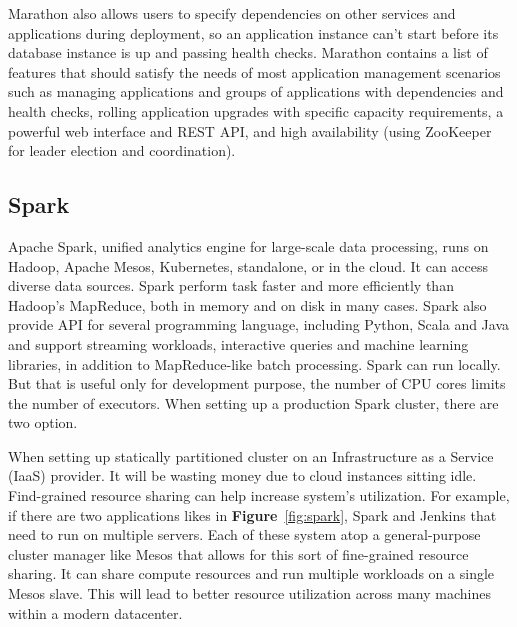 \documentclass[12pt,oneside,openright,a4paper]{cpe-english-project}
\begin{document}
Marathon also allows users to specify dependencies on other services and applications during deployment, so an application instance can’t start before its database instance is up and passing health checks. Marathon contains a list of features that should satisfy the needs of most application management scenarios such as managing applications and groups of applications with dependencies and health checks, rolling application upgrades with specific capacity requirements, a powerful web interface and REST API, and high availability (using ZooKeeper for leader election and coordination).\cite{mesosInAction}

\newpage
\subsection{Spark}
Apache Spark, unified analytics engine for large-scale data processing, runs on Hadoop, Apache Mesos, Kubernetes, standalone, or in the cloud. It can access diverse data sources. Spark perform task faster and more efficiently than Hadoop’s MapReduce, both in memory and on disk in many cases. Spark also provide API for several programming language, including Python, Scala and Java and support streaming workloads, interactive queries and machine learning libraries, in addition to MapReduce-like batch processing.  Spark can run locally. But that is useful only for development purpose, the number of CPU cores limits the number of executors. When setting up a production Spark cluster, there are two option.

When setting up statically partitioned cluster on an Infrastructure as a Service (IaaS) provider. It will be wasting money due to cloud instances sitting idle. Find-grained resource sharing can help increase system’s utilization. For example, if there are two applications likes in \textbf{Figure}~\ref{fig:spark}, Spark and Jenkins that need to run on multiple servers. Each of these system atop a general-purpose cluster manager like Mesos that allows for this sort of fine-grained resource sharing. It can share compute resources and run multiple workloads on a single Mesos slave. This will lead to better resource utilization across many machines within a modern datacenter.\cite{mesosInAction}
\end{document}
